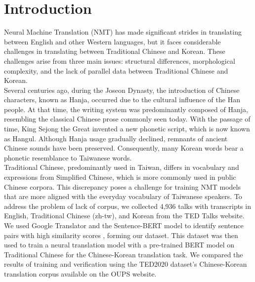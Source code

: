 \documentclass[PhD]{PHlab-thesis}
\begin{document}
\newcommand*\Acknowledgements{%
感謝我...}








\newpage
\setcounter{page}{1}


\chapter{Introduction}
Neural Machine Translation (NMT) has made significant strides in translating between English and other Western languages, but it faces considerable challenges in translating between Traditional Chinese and Korean. These challenges arise from three main issues: structural differences, morphological complexity, and the lack of parallel data between Traditional Chinese and Korean. \\
Several centuries ago, during the Joseon Dynasty, the introduction of Chinese characters, known as Hanja, occurred due to the cultural influence of the Han people. At that time, the writing system was predominantly composed of Hanja, resembling the classical Chinese prose commonly seen today. With the passage of time, King Sejong the Great invented a new phonetic script, which is now known as Hangul. Although Hanja usage gradually declined, remnants of ancient Chinese sounds have been preserved. Consequently, many Korean words bear a phonetic resemblance to Taiwanese words.\\
Traditional Chinese, predominantly used in Taiwan, differs in vocabulary and expressions from Simplified Chinese, which is more commonly used in public Chinese corpora. This discrepancy poses a challenge for training NMT models that are more aligned with the everyday vocabulary of Taiwanese speakers.
To address the problem of lack of corpus, we collected 4,936 talks with transcripts in English, Traditional Chinese (zh-tw), and Korean from the TED Talks website\cite{tedTalks}. We used Google Translator\cite{googletrans} and the Sentence-BERT\cite{reimers2019sentence} model to identify sentence pairs with high similarity scores , forming our dataset. This dataset was then used to train a neural translation model with a pre-trained BERT model on Traditional Chinese for the Chinese-Korean translation task.\cite{ckip-bert} We compared the results of training and verification using the TED2020 dataset's Chinese-Korean translation corpus available on the OUPS website.\cite{reimers-2020-multilingual-sentence-bert}
\end{document}
